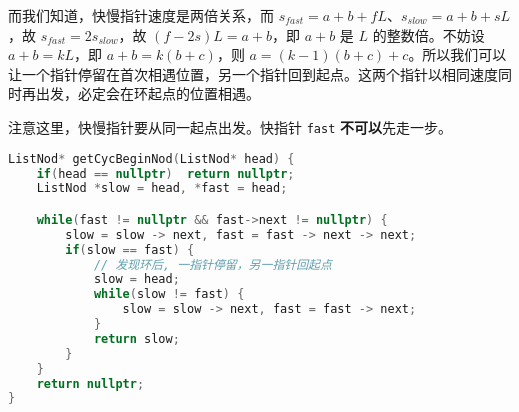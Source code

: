 而我们知道，快慢指针速度是两倍关系，而 $s_{fast} = a + b + fL$、$s_{slow} = a+ b + sL$，故 $s_{fast} = 2 s_{slow}$，故 $(f-2s)L = a+b$，即 $a+b$ 是 $L$ 的整数倍。不妨设 $a+b = k L$，即 $a+b=k (b+c)$，则 $a = (k-1)(b+c)+c$。所以我们可以让一个指针停留在首次相遇位置，另一个指针回到起点。这两个指针以相同速度同时再出发，必定会在环起点的位置相遇。

注意这里，快慢指针要从同一起点出发。快指针 \verb`fast` \textbf{不可以}先走一步。
\begin{lstlisting}[language=cpp]
ListNod* getCycBeginNod(ListNod* head) {
    if(head == nullptr)  return nullptr;
    ListNod *slow = head, *fast = head;

    while(fast != nullptr && fast->next != nullptr) {
        slow = slow -> next, fast = fast -> next -> next;
        if(slow == fast) {
            // 发现环后, 一指针停留，另一指针回起点
            slow = head;
            while(slow != fast) {
                slow = slow -> next, fast = fast -> next;
            }
            return slow;
        }
    }
    return nullptr;
}
\end{lstlisting}